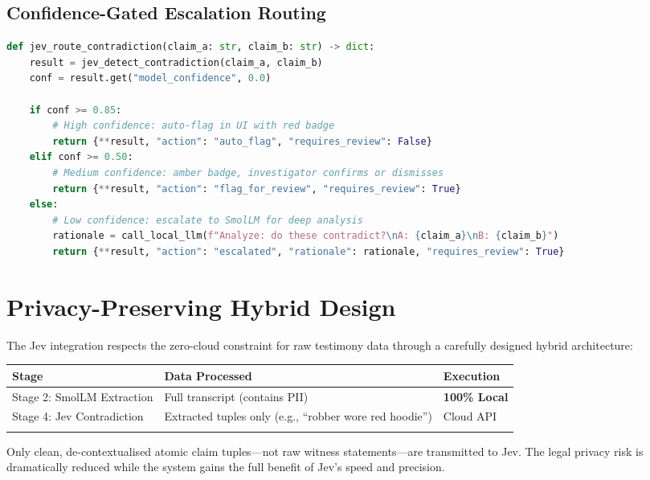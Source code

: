 \documentclass[12pt,a4paper]{report}
\begin{document}
\subsection{Confidence-Gated Escalation Routing}

\begin{lstlisting}[language=Python, caption={Confidence-gated routing: 3-tier action system for the React UI.}]
def jev_route_contradiction(claim_a: str, claim_b: str) -> dict:
    result = jev_detect_contradiction(claim_a, claim_b)
    conf = result.get("model_confidence", 0.0)

    if conf >= 0.85:
        # High confidence: auto-flag in UI with red badge
        return {**result, "action": "auto_flag", "requires_review": False}
    elif conf >= 0.50:
        # Medium confidence: amber badge, investigator confirms or dismisses
        return {**result, "action": "flag_for_review", "requires_review": True}
    else:
        # Low confidence: escalate to SmolLM for deep analysis
        rationale = call_local_llm(f"Analyze: do these contradict?\nA: {claim_a}\nB: {claim_b}")
        return {**result, "action": "escalated", "rationale": rationale, "requires_review": True}
\end{lstlisting}

\section{Privacy-Preserving Hybrid Design}

The Jev integration respects the zero-cloud constraint for raw testimony data through a carefully designed hybrid architecture:

\begin{center}
\begin{tabular}{p{5cm} p{4cm} p{4cm}}
\toprule
\textbf{Stage} & \textbf{Data Processed} & \textbf{Execution} \\
\midrule
Stage 2: SmolLM Extraction & Full transcript (contains PII) & \textbf{100\% Local} \\
Stage 4: Jev Contradiction & Extracted tuples only (e.g., ``robber wore red hoodie'') & Cloud API \\
\bottomrule
\caption{Privacy-Preserving Hybrid Architecture for Jev Integration}
\label{tab:hybrid}
\end{tabular}
\end{center}

Only clean, de-contextualised atomic claim tuples---not raw witness statements---are transmitted to Jev. The legal privacy risk is dramatically reduced while the system gains the full benefit of Jev's speed and precision.
\end{document}
